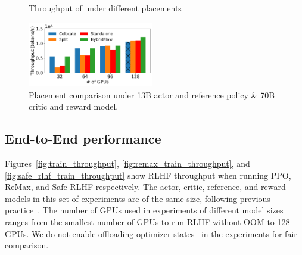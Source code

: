 \begin{figure}[t]
\begin{minipage}{0.65\textwidth}
\centering
{}
\vspace{-4mm}
\caption{Throughput of \sysname{} under different placements}
\label{fig:exp_placement}
\end{minipage}
\vspace{-3mm}
\begin{minipage}{0.33\textwidth}
    \vspace{3mm}
    \includegraphics[width=5.5cm]{figs/placement_mix.pdf}
    \vspace{-5mm}
    \caption{Placement comparison under 13B actor and reference policy \& 70B critic and reward model.}
    \label{fig:exp_mix_placement}
\end{minipage}
\end{figure}

\subsection{End-to-End %
performance} \label{sec:exp_e2e_train_performance}
Figures~\ref{fig:train_throughput}, \ref{fig:remax_train_throughput}, and \ref{fig:safe_rlhf_train_throughput} show RLHF throughput %
when running PPO, ReMax, and Safe-RLHF respectively. 
The actor, critic, reference, and reward models in this set of experiments are of the same size, following previous practice~\cite{bai2022training, yao2023deepspeedchat, ouyang2022training}. The number of GPUs used in experiments of different model sizes ranges from the smallest number of GPUs to run RLHF without OOM
to 128 GPUs. 
We do not enable offloading optimizer states~\cite{ren2021zerooffload} in the experiments for fair comparison.


